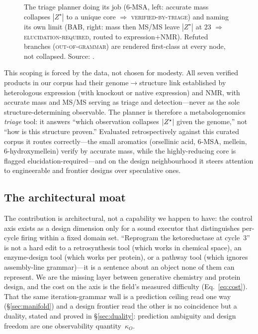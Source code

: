 \begin{figure}[t]
\begin{minipage}[t]{0.55\textwidth}
{}
\end{minipage}
\caption{The triage planner doing its job (6-MSA, left: accurate mass collapses $|Z^\star|$ to a unique
core $\Rightarrow$ \textsc{verified-by-triage}) and naming its own limit (BAB, right: mass then MS/MS
leave $|Z^\star|$ at $23$ $\Rightarrow$ \textsc{elucidation-required}, routed to expression$+$NMR).
Refuted branches (\textsc{out-of-grammar}) are rendered first-class at every node, not collapsed.
Source: .}
\label{fig:trees}
\end{figure}

This scoping is forced by the data, not chosen for modesty. All seven verified products in our corpus
had their genome$\to$structure link established by heterologous expression (with knockout or native
expression) and NMR, with accurate mass and MS/MS serving as triage and detection---never as the sole
structure-determining observable. The planner is therefore a metabologenomics \emph{triage} tool: it
answers ``which observation collapses $|Z^{\star}|$ given the genome,'' not ``how is this structure
proven.'' Evaluated retrospectively against this curated corpus it routes correctly---the small aromatics
(orsellinic acid, 6-MSA, mellein, 6-hydroxymellein) verify by accurate mass, while the highly-reducing
core is flagged elucidation-required---and on the design neighbourhood it steers attention to
engineerable and frontier designs over speculative ones.

\subsection{The architectural moat}\label{sec:moat}
The contribution is architectural, not a capability we happen to have: the control axis exists as a
design dimension only for a sound executor that distinguishes per-cycle firing within a fixed domain set.
``Reprogram the ketoreductase at cycle~3'' is not a hard edit to a retrosynthesis tool (which works in
chemical space), an enzyme-design tool (which works per protein), or a pathway tool (which ignores
assembly-line grammar)---it is a sentence about an object none of them can represent. We are the missing
layer between generative chemistry and protein design, and the cost on the axis is the field's measured
difficulty (Eq.~\eqref{eq:cost}). That the same iteration-grammar wall is a prediction ceiling read one
way (\S\ref{sec:manifold}) and a design frontier read the other is no coincidence but a duality, stated
and proved in \S\ref{sec:duality}: prediction ambiguity and design freedom are one observability
quantity~$\kappa_O$.
